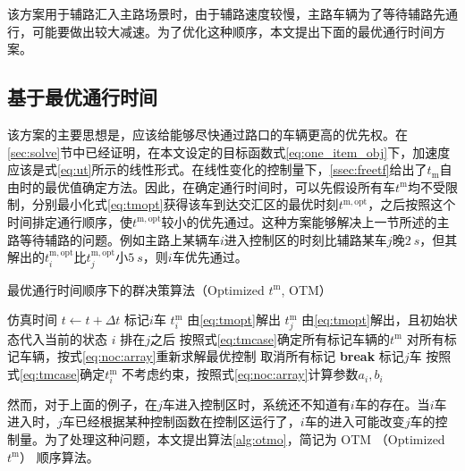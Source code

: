 该方案用于辅路汇入主路场景时，由于辅路速度较慢，主路车辆为了等待辅路先通行，可能要做出较大减速。为了优化这种顺序，本文提出下面的最优通行时间方案。

\subsection{基于最优通行时间}
该方案的主要思想是，应该给能够尽快通过路口的车辆更高的优先权。在\ref{sec:solve}节中已经证明，在本文设定的目标函数式\eqref{eq:one_item_obj}下，加速度应该是式\eqref{eq:ut}所示的线性形式。在线性变化的控制量下，\ref{ssec:freetf}给出了$t_\mathrm{m}$自由时的最优值确定方法。因此，在确定通行时间时，可以先假设所有车$t^\mathrm{m}$均不受限制，分别最小化式\eqref{eq:tmopt}获得该车到达交汇区的最优时刻$t^\mathrm{m,opt}$，之后按照这个时间排定通行顺序，使$t^\mathrm{m,opt}$较小的优先通过。这种方案能够解决上一节所述的主路等待辅路的问题。例如主路上某辆车$i$进入控制区的时刻比辅路某车$j$晚$\SI{2}{s}$，但其解出的$t_i^\mathrm{m,opt}$比$t_j^\mathrm{m,opt}$小$\SI{5}{s}$，则$i$车优先通过。

\begin{algorithm}[htbp]
\small
\caption{最优通行时间顺序下的群决策算法（Optimized $t^\mathrm{m}$, OTM）}
\label{alg:otmo}
\begin{algorithmic}
  \Statex
    \State 仿真时间 $t\gets t+\Delta t$
          \State 标记$i$车
            \State $t_i^\mathrm{m}$ 由\eqref{eq:tmopt}解出
            \State $t_j^\mathrm{m}$ 由\eqref{eq:tmopt}解出，且初始状态代入当前的状态
              \State $i$ 排在$j$之后
              \State 按照式\eqref{eq:tmcase}确定所有标记车辆的$t^\mathrm{m}$
              \State 对所有标记车辆，按式\eqref{eq:noc:array}重新求解最优控制
              \State 取消所有标记
              \State \textbf{break}
            \EndIf
            \State 标记$j$车
          \EndFor
        \Else
          \State 按照式\eqref{eq:tmcase}确定$t_i^\mathrm{m}$
          \State 不考虑约束，按照式\eqref{eq:noc:array}计算参数$a_i, b_i$
        \EndIf
      \EndFor
    \EndIf
  \EndWhile
\end{algorithmic}
\end{algorithm}

然而，对于上面的例子，在$j$车进入控制区时，系统还不知道有$i$车的存在。当$i$车进入时，$j$车已经根据某种控制函数在控制区运行了，$i$车的进入可能改变$j$车的控制量。为了处理这种问题，本文提出算法\eqref{alg:otmo}，简记为 OTM （Optimized $t^\mathrm{m}$） 顺序算法。

